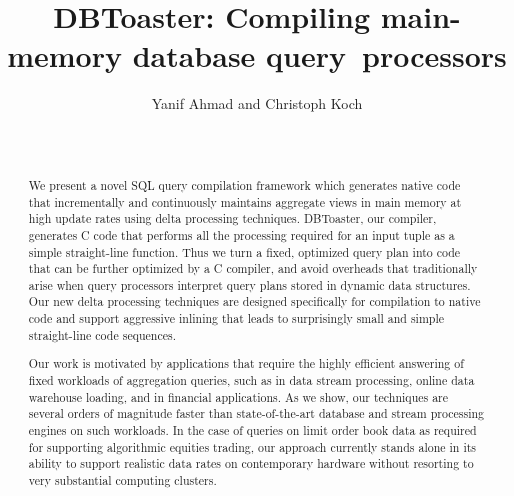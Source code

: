 \documentclass{vldb}
\title{DBToaster: Compiling main-memory database query~processors}
\author{
\alignauthor Yanif Ahmad and Christoph Koch \\
\affaddr{Department of Computer Science} \\
\affaddr{Cornell University, Ithaca, NY} \\
\email{\{yanif, koch\}@cs.cornell.edu}}
\date{}
\begin{document}
\maketitle


\begin{abstract}
We  present a novel  SQL query  compilation framework  which generates
native  code that incrementally  and continuously  maintains aggregate
views  in main  memory at  high  update rates  using delta  processing
techniques. DBToaster,  our compiler,
generates C  code that  performs all the  processing required  for an
input  tuple as  a simple  straight-line function. Thus we turn  a
fixed, optimized
query plan into code that can be further optimized by a C compiler, and avoid
overheads that traditionally arise when query processors interpret
query plans stored in dynamic data structures.
Our new delta processing techniques are designed specifically
for compilation to native code and support aggressive inlining
that leads to surprisingly small and simple
straight-line code sequences.

Our  work  is  motivated  by  applications  that  require  the  highly
efficient answering of fixed workloads of aggregation queries, such as
in  data stream  processing,  online data  warehouse  loading, and  in
financial applications. As we  show, our techniques are several orders
of  magnitude   faster  than  state-of-the-art   database  and  stream
processing engines on such workloads.  In the case of queries on limit
order  book  data  as  required for  supporting  algorithmic  equities
trading, our approach currently stands alone in its ability to support
realistic  data rates  on contemporary  hardware without  resorting to
very substantial computing clusters.
\end{abstract}










\footnotesize{


}
\end{document}
